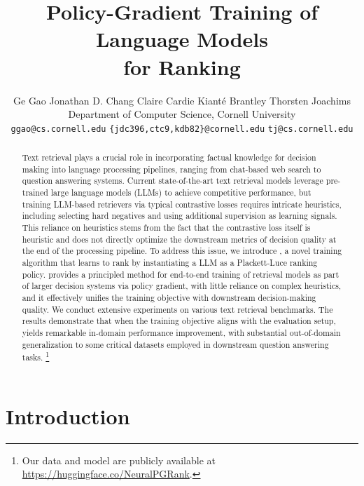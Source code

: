 \documentclass{article}
\title{Policy-Gradient Training of
Language Models \\ for Ranking}
\author{
Ge Gao \hspace{1.1em} Jonathan D. Chang  \hspace{1.1em} Claire Cardie \hspace{1.1em}  Kiant\'e Brantley \hspace{1.1em} Thorsten Joachims \\
\hspace{0.05em} Department of Computer Science, Cornell University \\
\hspace{0.05em} \texttt{ggao@cs.cornell.edu}
\hspace{1.2em} \texttt{\{jdc396,ctc9,kdb82\}@cornell.edu} 
\hspace{1.2em} \texttt{tj@cs.cornell.edu} 
}
\begin{document}
\maketitle

\vspace{5pt}
\begin{abstract}
Text retrieval plays a crucial role in incorporating factual knowledge for decision making into language processing pipelines, ranging from chat-based web search to question answering systems. 
Current state-of-the-art text retrieval models leverage pre-trained large language models (LLMs) to achieve competitive performance, but training LLM-based retrievers via typical contrastive losses requires intricate heuristics, including selecting hard negatives and using additional supervision as learning signals.
This reliance on heuristics stems from the fact that the contrastive loss itself is heuristic and does not directly optimize the downstream metrics of decision quality at the end of the processing pipeline. To address this issue, we introduce \alg{}, a novel training algorithm that learns to rank by instantiating a LLM as a Plackett-Luce ranking policy. \alg{} provides a principled method for end-to-end training of retrieval models as part of larger decision systems via policy gradient, with little reliance on complex heuristics, and it effectively unifies the training objective with downstream decision-making quality. We conduct extensive experiments on various text retrieval benchmarks. The results demonstrate that when the training objective aligns with the evaluation setup, \alg{} yields remarkable in-domain performance improvement, with substantial out-of-domain generalization to some critical datasets employed in downstream question answering tasks. \footnote{Our data and model are publicly available at \url{https://huggingface.co/NeuralPGRank}.}

\end{abstract}

\section{Introduction}
\end{document}
